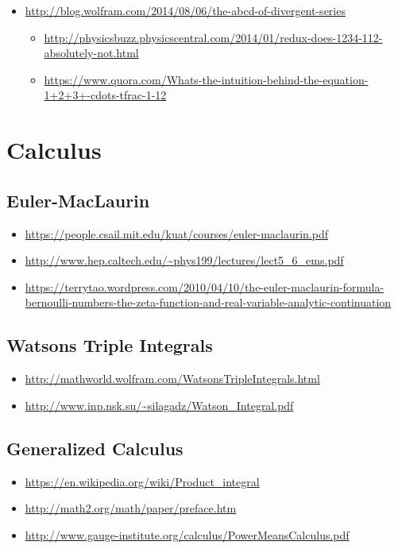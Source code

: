 \begin{itemize}
\item \url{http://blog.wolfram.com/2014/08/06/the-abcd-of-divergent-series}
\begin{itemize}
\item \url{http://physicsbuzz.physicscentral.com/2014/01/redux-does-1234-112-absolutely-not.html}
\item \url{https://www.quora.com/Whats-the-intuition-behind-the-equation-1+2+3+-cdots-tfrac-1-12}
\end{itemize}
\end{itemize}

\section{Calculus}

\subsection{Euler-MacLaurin}
\begin{itemize}
\item \url{https://people.csail.mit.edu/kuat/courses/euler-maclaurin.pdf}
\item \url{http://www.hep.caltech.edu/~phys199/lectures/lect5_6_ems.pdf}
\item \url{https://terrytao.wordpress.com/2010/04/10/the-euler-maclaurin-formula-bernoulli-numbers-the-zeta-function-and-real-variable-analytic-continuation}
\end{itemize}

\subsection{Watsons Triple Integrals}
\begin{itemize}
\item \url{http://mathworld.wolfram.com/WatsonsTripleIntegrals.html}
\item \url{http://www.inp.nsk.su/~silagadz/Watson_Integral.pdf}
\end{itemize}

\subsection{Generalized Calculus}
\begin{itemize}
\item \url{https://en.wikipedia.org/wiki/Product_integral}
\item \url{http://math2.org/math/paper/preface.htm}
\item \url{http://www.gauge-institute.org/calculus/PowerMeansCalculus.pdf}
\end{itemize}

